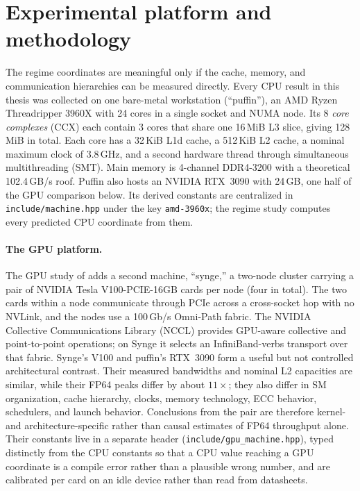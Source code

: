 \section{Experimental platform and methodology}\label{sec:platform}

The regime coordinates are meaningful only if the cache, memory, and communication hierarchies can be measured directly. Every CPU result in this thesis was collected on one bare-metal workstation (``puffin''), an AMD Ryzen Threadripper 3960X with 24 cores in a single socket and NUMA node. Its 8 \emph{core complexes} (CCX) each contain 3 cores that share one 16\,MiB L3 slice, giving 128\,MiB in total. Each core has a 32\,KiB L1d cache, a 512\,KiB L2 cache, a nominal maximum clock of 3.8\,GHz, and a second hardware thread through simultaneous multithreading (SMT). Main memory is 4-channel DDR4-3200 with a theoretical 102.4\,GB/s roof. Puffin also hosts an NVIDIA RTX~3090 with 24\,GB, one half of the GPU comparison below. Its derived constants are centralized in \texttt{include/machine.hpp} under the key \texttt{amd-3960x}; the regime study computes every predicted CPU coordinate from them.

\paragraph{The GPU platform.} The GPU study of  adds a second machine, ``synge,'' a two-node cluster carrying a pair of NVIDIA Tesla V100-PCIE-16GB cards per node (four in total). The two cards within a node communicate through PCIe across a cross-socket hop with no NVLink, and the nodes use a 100\,Gb/s Omni-Path fabric. The NVIDIA Collective Communications Library (NCCL) provides GPU-aware collective and point-to-point operations; on Synge it selects an InfiniBand-verbs transport over that fabric. Synge's V100 and puffin's RTX~3090 form a useful but not controlled architectural contrast. Their measured bandwidths and nominal L2 capacities are similar, while their FP64 peaks differ by about $11\times$; they also differ in SM organization, cache hierarchy, clocks, memory technology, ECC behavior, schedulers, and launch behavior. Conclusions from the pair are therefore kernel- and architecture-specific rather than causal estimates of FP64 throughput alone. Their constants live in a separate header (\texttt{include/gpu\_machine.hpp}), typed distinctly from the CPU constants so that a CPU value reaching a GPU coordinate is a compile error rather than a plausible wrong number, and are calibrated per card on an idle device rather than read from datasheets.

